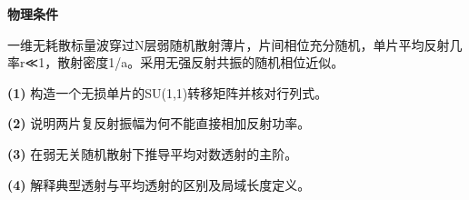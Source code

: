 \textbf{物理条件}\par 一维无耗散标量波穿过N层弱随机散射薄片，片间相位充分随机，单片平均反射几率r≪1，散射密度1/a。采用无强反射共振的随机相位近似。
\par\noindent\textbf{(1)} 构造一个无损单片的SU(1,1)转移矩阵并核对行列式。
\par\noindent\textbf{(2)} 说明两片复反射振幅为何不能直接相加反射功率。
\par\noindent\textbf{(3)} 在弱无关随机散射下推导平均对数透射的主阶。
\par\noindent\textbf{(4)} 解释典型透射与平均透射的区别及局域长度定义。
